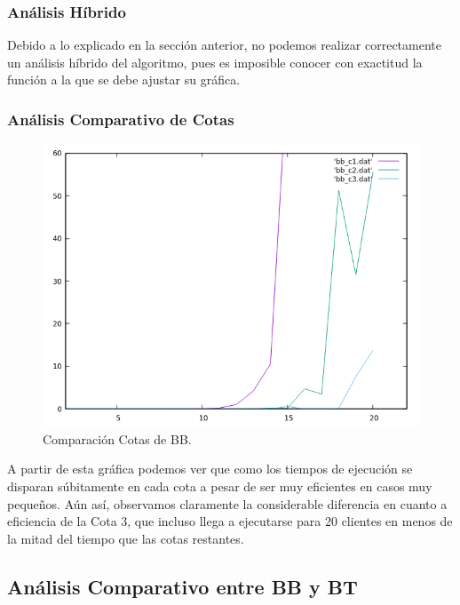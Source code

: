 \documentclass[a4paper,12pt,twoside]{article} %
\begin{document}
\subsubsection{Análisis Híbrido}
Debido a lo explicado en la sección anterior, no podemos realizar correctamente un análisis híbrido del algoritmo, pues es imposible conocer con exactitud la función a la que se debe ajustar su gráfica.

\subsubsection{Análisis Comparativo de Cotas}

\begin{figure}[h]
  \begin{center}
  
  	\includegraphics[scale=0.7]{IMAGENES/comparativa_bb.png}
  	\caption{Comparación Cotas de BB.}
  	
  \end{center}
\end{figure}

A partir de esta gráfica podemos ver que como los tiempos de ejecución se disparan súbitamente en cada cota a pesar de ser muy eficientes en casos muy pequeños. Aún así, observamos claramente la considerable diferencia en cuanto a eficiencia de la Cota 3, que incluso llega a ejecutarse para 20 clientes en menos de la mitad del tiempo que las cotas restantes.
\newpage

\subsection{Análisis Comparativo entre BB y BT}
\end{document}
